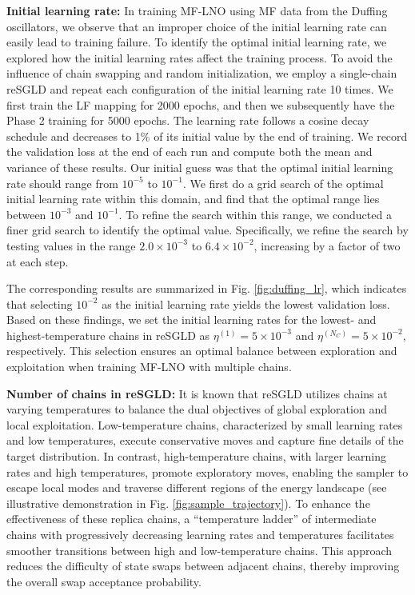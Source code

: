 \textbf{Initial learning rate:} In training MF-LNO using MF data from the Duffing oscillators, we observe that an improper choice of the initial learning rate can easily lead to training failure. To identify the optimal initial learning rate, we explored how the initial learning rates affect the training process. To avoid the influence of chain swapping and random initialization, we employ a single-chain reSGLD and repeat each configuration of the initial learning rate 10 times. We first train the LF mapping for 2000 epochs, and then we subsequently have the Phase 2 training for 5000 epochs. The learning rate follows a cosine decay schedule and decreases to 1\% of its initial value by the end of training. We record the validation loss at the end of each run and compute both the mean and variance of these results. Our initial guess was that the optimal initial learning rate should range from $ 10^{-5} $ to $ 10^{-1} $. We first do a grid search of the optimal initial learning rate within this domain, and find that the optimal range lies between $ 10^{-3} $ and $ 10^{-1} $. To refine the search within this range, we conducted a finer grid search to identify the optimal value. Specifically, we refine the search by testing values in the range $ 2.0 \times 10^{-3} $ to $ 6.4 \times 10^{-2} $, increasing by a factor of two at each step.

The corresponding results are summarized in Fig. \ref{fig:duffing_lr}, which indicates that selecting $10^{-2}$ as the initial learning rate yields the lowest validation loss. Based on these findings, we set the initial learning rates for the lowest- and highest-temperature chains in reSGLD as $ \eta^{(1)} = 5 \times 10^{-3} $ and $ \eta^{(N_C)} = 5 \times 10^{-2} $, respectively. This selection ensures an optimal balance between exploration and exploitation when training MF-LNO with multiple chains.


\textbf{Number of chains in reSGLD:} It is known that reSGLD utilizes chains at varying temperatures to balance the dual objectives of global exploration and local exploitation. Low-temperature chains, characterized by small learning rates and low temperatures, execute conservative moves and capture fine details of the target distribution. In contrast, high-temperature chains, with larger learning rates and high temperatures, promote exploratory moves, enabling the sampler to escape local modes and traverse different regions of the energy landscape (see illustrative demonstration in Fig. \ref{fig:sample_trajectory}). To enhance the effectiveness of these replica chains, a ``temperature ladder'' of intermediate chains with progressively decreasing learning rates and temperatures facilitates smoother transitions between high and low-temperature chains. This approach reduces the difficulty of state swaps between adjacent chains, thereby improving the overall swap acceptance probability.

